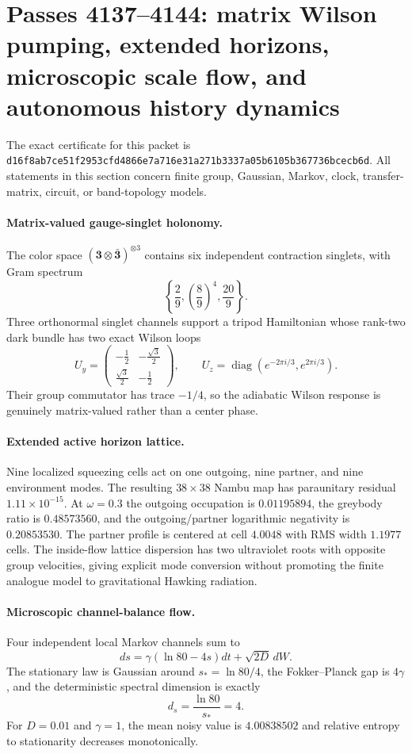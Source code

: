\section{Passes 4137--4144: matrix Wilson pumping, extended horizons, microscopic scale flow, and autonomous history dynamics}
\label{sec:passes4137-4144}

The exact certificate for this packet is
\texttt{d16f8ab7ce51f2953cfd4866e7a716e31a271b3337a05b6105b367736bcecb6d}.
All statements in this section concern finite group, Gaussian, Markov, clock, transfer-matrix, circuit, or band-topology models.

\paragraph{Matrix-valued gauge-singlet holonomy.}
The color space $(\mathbf3\otimes\bar{\mathbf3})^{\otimes3}$ contains six independent contraction singlets, with Gram spectrum
\[
\left\{\frac29,\left(\frac89\right)^4,\frac{20}{9}\right\}.
\]
Three orthonormal singlet channels support a tripod Hamiltonian whose rank-two dark bundle has two exact Wilson loops
\[
U_y=\begin{pmatrix}-\frac12&-\frac{\sqrt3}{2}\\[2pt]\frac{\sqrt3}{2}&-\frac12\end{pmatrix},
\qquad
U_z=\operatorname{diag}(e^{-2\pi i/3},e^{2\pi i/3}).
\]
Their group commutator has trace $-1/4$, so the adiabatic Wilson response is genuinely matrix-valued rather than a center phase.

\paragraph{Extended active horizon lattice.}
Nine localized squeezing cells act on one outgoing, nine partner, and nine environment modes.  The resulting $38\times38$ Nambu map has paraunitary residual $1.11\times10^{-15}$.  At $\omega=0.3$ the outgoing occupation is $0.01195894$, the greybody ratio is $0.48573560$, and the outgoing/partner logarithmic negativity is $0.20853530$.  The partner profile is centered at cell $4.0048$ with RMS width $1.1977$ cells.  The inside-flow lattice dispersion has two ultraviolet roots with opposite group velocities, giving explicit mode conversion without promoting the finite analogue model to gravitational Hawking radiation.

\paragraph{Microscopic channel-balance flow.}
Four independent local Markov channels sum to
\[
ds=\gamma(\ln80-4s)dt+\sqrt{2D}\,dW.
\]
The stationary law is Gaussian around $s_*=\ln80/4$, the Fokker--Planck gap is $4\gamma$, and the deterministic spectral dimension is exactly
\[
d_s=\frac{\ln80}{s_*}=4.
\]
For $D=0.01$ and $\gamma=1$, the mean noisy value is $4.00838502$ and relative entropy to stationarity decreases monotonically.

